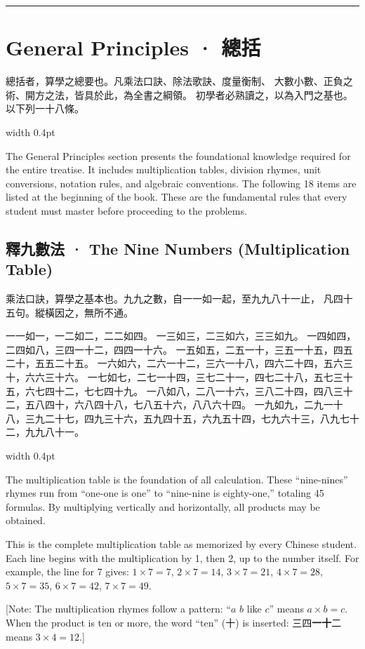 \documentclass[10pt,a4paper]{article}
\newcommand{\longline}{\noindent\rule{\textwidth}{0.3pt}}
\newlength{\cnwidth}
\newlength{\enwidth}
\newcommand{\bilingual}[2]{%
  \noindent%
  \begin{minipage}[t]{\cnwidth}%
    #1%
  \end{minipage}%
  \hfill\vrule width 0.4pt\hfill%
  \begin{minipage}[t]{\enwidth}%
    #2%
  \end{minipage}%
  \par\smallskip%
}
\newcommand{\bilingualsection}[2]{%
  \section*{#1 · #2}
  \addcontentsline{toc}{section}{#1 · #2}
}
\newcommand{\bilingualsubsection}[2]{%
  \subsection*{#1 · #2}
}
\newcommand{\transnote}[1]{%
  \par\smallskip\noindent\textcolor{notecolor}{\small[Note: #1]}\par\smallskip
}
\begin{document}
\longline

\bilingualsection{General Principles}{總括}
\label{sec:zongguo}

\bilingual{%
  總括者，算學之總要也。凡乘法口訣、除法歌訣、度量衡制、
  大數小數、正負之術、開方之法，皆具於此，為全書之綱領。
  初學者必熟讀之，以為入門之基也。以下列一十八條。
}{%
  The General Principles section presents the foundational knowledge required for
  the entire treatise. It includes multiplication tables, division rhymes, unit
  conversions, notation rules, and algebraic conventions. The following 18 items
  are listed at the beginning of the book. These are the fundamental rules that
  every student must master before proceeding to the problems.
}

\bilingualsubsection{釋九數法}{The Nine Numbers (Multiplication Table)}

\bilingual{%
  乘法口訣，算學之基本也。九九之數，自一一如一起，至九九八十一止，
  凡四十五句。縱橫因之，無所不通。

  一一如一，一二如二，二二如四。
  一三如三，二三如六，三三如九。
  一四如四，二四如八，三四一十二，四四一十六。
  一五如五，二五一十，三五一十五，四五二十，五五二十五。
  一六如六，二六一十二，三六一十八，四六二十四，五六三十，六六三十六。
  一七如七，二七一十四，三七二十一，四七二十八，五七三十五，六七四十二，七七四十九。
  一八如八，二八一十六，三八二十四，四八三十二，五八四十，六八四十八，七八五十六，八八六十四。
  一九如九，二九一十八，三九二十七，四九三十六，五九四十五，六九五十四，七九六十三，八九七十二，九九八十一。
}{%
  The multiplication table is the foundation of all calculation. These ``nine-nines''
  rhymes run from ``one-one is one'' to ``nine-nine is eighty-one,'' totaling 45 formulas.
  By multiplying vertically and horizontally, all products may be obtained.

  This is the complete multiplication table as memorized by every Chinese student.
  Each line begins with the multiplication by 1, then 2, up to the number itself.
  For example, the line for 7 gives: $1 \times 7 = 7$, $2 \times 7 = 14$, $3 \times 7 = 21$,
  $4 \times 7 = 28$, $5 \times 7 = 35$, $6 \times 7 = 42$, $7 \times 7 = 49$.
}

\transnote{The multiplication rhymes follow a pattern: ``$a$ $b$ like $c$'' means $a \times b = c$.
When the product is ten or more, the word ``ten'' (十) is inserted: 三四\textbf{一十}二 means
$3 \times 4 = 12$.}
\end{document}
